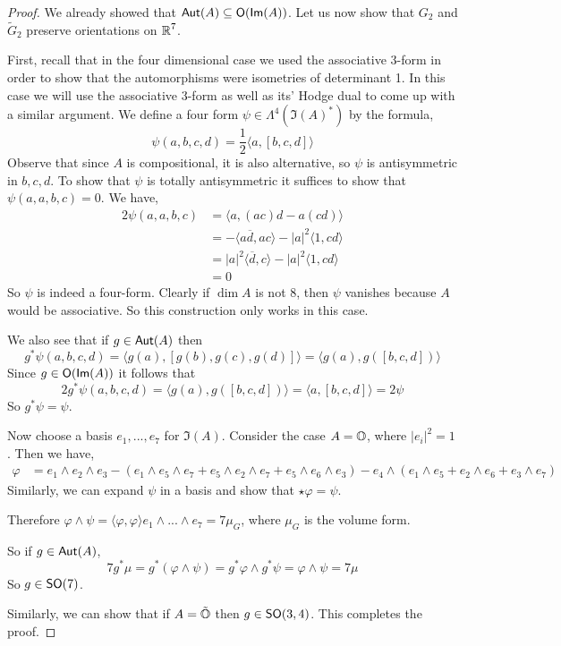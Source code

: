 \begin{proof}
    We already showed that $\operatorname{\textsf{Aut}}(A) \subseteq \operatorname{\textsf{O}}(\textsf{Im}(A))$. Let us now show that $G_2$ and $\tilde{G}_2$ preserve orientations on $\operatorname{\mathbb{R}}^7$.

    First, recall that in the four dimensional case we used the associative 3-form in order to show that the automorphisms were isometries of determinant 1. In this case we will use the associative 3-form as well as its' Hodge dual to come up with a similar argument. We define a four form $\psi \in \Lambda^4(\Im(A)^*)$ by the formula,
    \[\psi(a,b,c,d) = \frac{1}{2}\langle a,[b,c,d]\rangle\]
    Observe that since $A$ is compositional, it is also alternative, so $\psi$ is antisymmetric in $b,c,d$. To show that $\psi$ is totally antisymmetric it suffices to show that $\psi(a,a,b,c)=0$. We have,
    \begin{align*}
        2\psi(a,a,b,c)&=\langle a,(ac)d-a(cd)\rangle\\&=
        -\langle a\overline{d},ac\rangle -|a|^2\langle 1,cd\rangle\\
        &= |a|^2\langle \overline{d},c\rangle-|a|^2\langle 1,cd\rangle\\&=0
    \end{align*}
    So $\psi$ is indeed a four-form. Clearly if $\dim A$ is not 8, then $\psi$ vanishes because $A$ would be associative. So this construction only works in this case.

    We also see that if $g \in \operatorname{\textsf{Aut}}(A)$ then 
    \[g^*\psi(a,b,c,d) = \langle g(a),[g(b),g(c),g(d)]\rangle = \langle g(a),g([b,c,d])\rangle\] Since $g\in \operatorname{\textsf{O}}(\textsf{Im}(A))$ it follows that 
    \[2g^*\psi(a,b,c,d) = \langle g(a),g([b,c,d])\rangle=\langle a,[b,c,d]\rangle =2 \psi\]
    So $g^*\psi = \psi$. 

    Now choose a basis $e_1,...,e_7$ for $\Im(A)$. Consider the case $A = \operatorname{\mathbb{O}}$, where $|e_i|^2 = 1$. Then we have,
    \begin{align*}
        \varphi &= e_1\wedge e_2\wedge e_3 - (e_1\wedge e_5\wedge e_7 + e_5\wedge e_2 \wedge e_7+e_5\wedge e_6\wedge e_3) - e_4\wedge(e_1\wedge e_5+e_2\wedge e_6+e_3\wedge e_7)
    \end{align*}
    Similarly, we can expand $\psi$ in a basis and show that $\star\varphi = \psi$.
    
Therefore $\varphi\wedge\psi = \langle \varphi,\varphi\rangle e_1\wedge...\wedge e_7 = 7\mu_G$, where $\mu_G$ is the volume form.

So if $g\in \operatorname{\textsf{Aut}}(A)$, 
\[7g^*\mu = g^*(\varphi\wedge\psi) = g^*\varphi \wedge g^*\psi = \varphi\wedge \psi = 7\mu\]
So $g \in \operatorname{\textsf{SO}}(7)$.

Similarly, we can show that if $A = \tilde{\operatorname{\mathbb{O}}}$ then $g \in \operatorname{\textsf{SO}}(3,4)$. This completes the proof.
\end{proof}
